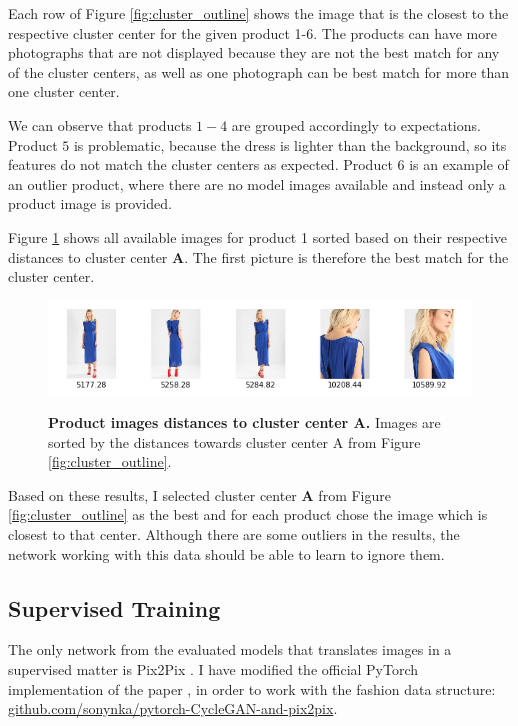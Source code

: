 \documentclass[12pt]{report}
\begin{document}
Each row of Figure \ref{fig:cluster_outline} shows the image that is the closest to the respective cluster center for the given product 1-6. The products can have more photographs that are not displayed because they are not the best match for any of the cluster centers, as well as  one photograph can be best match for more than one cluster center. 

We can observe that products $1-4$ are grouped accordingly to expectations. Product $5$ is problematic, because the dress is lighter than the background, so its features do not match the cluster centers as expected. Product $6$ is an example of an outlier product, where there are no model images available and instead only a product image is provided.

Figure \ref{fig:cluster_outline_distances} shows all available images for product 1 sorted based on their respective distances to cluster center \textbf{A}. The first picture is therefore the best match for the cluster center.

\begin{figure}[h]
\centering
{\includegraphics[width=\linewidth]{04_experiments/clustering/outlines_distances}}
\caption{\label{fig:cluster_outline_distances} \textbf{Product images distances to cluster center A.} Images are sorted by the distances towards cluster center A from Figure \ref{fig:cluster_outline}.}
\end{figure}

Based on these results, I selected cluster center \textbf{A} from Figure \ref{fig:cluster_outline} as the best and for each product chose the image which is closest to that center. Although there are some outliers in the results, the network working with this data should be able to learn to ignore them.

\pagebreak
\subsection{Supervised Training}
The only network from the evaluated models that translates images in a supervised matter is Pix2Pix \cite{isola_image--image_2016}. I have modified the official PyTorch implementation of the paper \cite{noauthor_junyanz/pytorch-cyclegan-and-pix2pix_nodate}, in order to work with the fashion data structure: \hyperlink{https://github.com/sonynka/pytorch-CycleGAN-and-pix2pix}{github.com/sonynka/pytorch-CycleGAN-and-pix2pix}.
\end{document}
